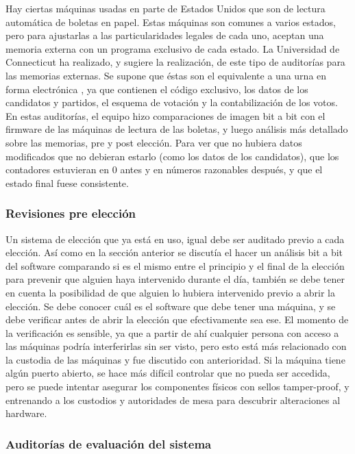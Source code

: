Hay ciertas máquinas usadas en parte de Estados Unidos que son de lectura automática de boletas en papel. Estas máquinas son comunes a varios estados, pero para ajustarlas a las particularidades legales de cada uno, aceptan una memoria externa con un programa exclusivo de cada estado. La Universidad de Connecticut ha realizado, y sugiere la realización, de este tipo de auditorías para las memorias externas. Se supone que éstas son el equivalente a una urna en forma electrónica \cite{preElection}, ya que contienen el código exclusivo, los datos de los candidatos y partidos, el esquema de votación y la contabilización de los votos.
En estas auditorías, el equipo hizo comparaciones de imagen bit a bit con el firmware de las máquinas de lectura de las boletas, y luego análisis más detallado sobre las memorias, pre y post elección. Para ver que no hubiera datos modificados que no debieran estarlo (como los datos de los candidatos), que los contadores estuvieran en 0 antes y en números razonables después, y que el estado final fuese consistente.

\subsubsection{Revisiones pre elección}

Un sistema de elección que ya está en uso, igual debe ser auditado previo a cada elección. Así como en la sección anterior se discutía el hacer un análisis bit a bit del software comparando si es el mismo entre el principio y el final de la elección para prevenir que alguien haya intervenido durante el día, también se debe tener en cuenta la posibilidad de que alguien lo hubiera intervenido previo a abrir la elección. Se debe conocer cuál es el software que debe tener una máquina, y se debe verificar antes de abrir la elección que efectivamente sea ese\cite{holanda}.
El momento de la verificación es sensible, ya que a partir de ahí cualquier persona con acceso a las máquinas podría interferirlas sin ser visto, pero esto está más relacionado con la custodia de las máquinas y fue discutido con anterioridad. Si la máquina tiene algún puerto abierto, se hace más difícil controlar que no pueda ser accedida, pero se puede intentar asegurar los componentes físicos con sellos tamper-proof, y entrenando a los custodios y autoridades de mesa para descubrir alteraciones al hardware.

\subsubsection{Auditorías de evaluación del sistema}

